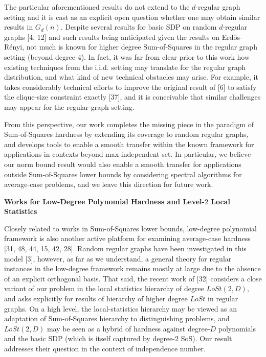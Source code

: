 \documentclass[10pt,a4paper]{article}
\begin{document}
The particular aforementioned results do not extend to the $d$-regular graph setting and it is cast as an explicit open question whether one may obtain similar results in $G_{d}(n)$. Despite several results for basic SDP on random $d$-regular graphs [4, 12] and such results being anticipated given the results on Erdős-Rényi, not much is known for higher degree Sum-of-Squares in the regular graph setting (beyond degree-$4$). In fact,
it was far from clear prior to this work how existing techniques from the i.i.d. setting may translate for the regular graph distribution, and what kind of new technical obstacles may arise. For example, it takes considerably technical efforts to improve the original result of [6] to satisfy the clique-size constraint exactly [37], and it is conceivable that similar challenges may appear for the regular graph setting.\par




From this perspective, our work completes the missing piece in the paradigm of Sum-of-Squares hardness by extending its coverage to random regular graphs, and develops tools to enable a smooth transfer within the known framework for applications in contexts beyond max independent set. In particular, we believe our norm bound result would also enable a smooth transfer for applications outside Sum-of-Squares lower bounds by considering spectral algorithms for average-case problems, and we leave this direction for future work.\par




\par\medskip\noindent\textbf{Works for Low-Degree Polynomial Hardness and Level-$2$ Local Statistics}\par




Closely related to works in Sum-of-Squares lower bounds, low-degree polynomial framework is also another active platform for examining average-case hardness [31, 48, 44, 15, 42, 28]. Random regular graphs have been investigated in this model [3], however, as far as we understand, a general theory for regular instances in the low-degree framework remains mostly at large due to the absence of an explicit orthogonal basis. That said, the recent work of [32] considers a close variant of our problem in the local statistics hierarchy of degree $LoSt(2,D)$, and asks explicitly for results of hierarchy of higher degree $LoSt$ in regular graphs. On a high level, the local-statistics hierarchy may be viewed as an adaptation of Sum-of-Squares hierarchy to distinguishing problems, and $LoSt(2,D)$ may be seen as a hybrid of hardness against degree-$D$ polynomials and the basic SDP (which is itself captured by degree-$2$ SoS). Our result addresses their question in the context of independence number.\par
\end{document}
